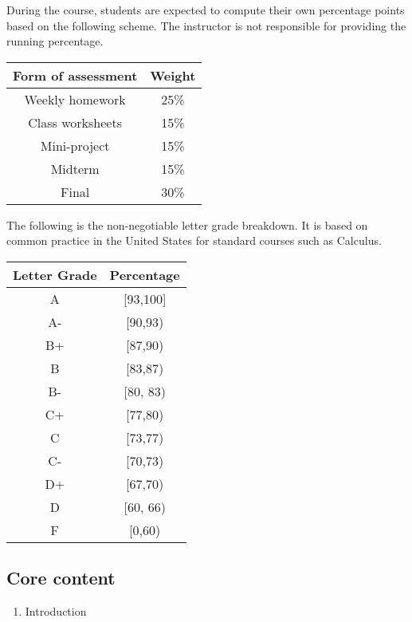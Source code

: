 \documentclass[
]{article}
\providecommand{\tightlist}{%
  \setlength{\itemsep}{0pt}\setlength{\parskip}{0pt}}
\begin{document}
During the course, students are expected to compute their own percentage
points based on the following scheme.
The instructor is not responsible for providing the running percentage.

\begin{longtable}[]{@{}cc@{}}
\toprule\noalign{}
\textbf{Form of assessment} & \textbf{Weight} \\
\midrule\noalign{}
\endhead
\bottomrule\noalign{}
\endlastfoot
Weekly homework & 25\% \\
Class worksheets & 15\% \\
Mini-project & 15\% \\
Midterm & 15\% \\
Final & 30\% \\
\end{longtable}

The following is the non-negotiable letter grade breakdown. It is based on
common practice in the United States for standard courses such as Calculus.

\begin{longtable}[]{@{}cc@{}}
\toprule\noalign{}
\textbf{Letter Grade} & \textbf{Percentage} \\
\midrule\noalign{}
\endhead
\bottomrule\noalign{}
\endlastfoot
A & {[}93,100{]} \\
A- & {[}90,93) \\
B+ & {[}87,90) \\
B & {[}83,87) \\
B- & {[}80, 83) \\
C+ & {[}77,80) \\
C & {[}73,77) \\
C- & {[}70,73) \\
D+ & {[}67,70) \\
D & {[}60, 66) \\
F & {[}0,60) \\
\end{longtable}

\hypertarget{core-content}{%
\subsection*{Core content}\label{core-content}}

\begin{enumerate}
\def\labelenumi{\arabic{enumi}.}
\tightlist
\item
  Introduction
\end{enumerate}
\end{document}
